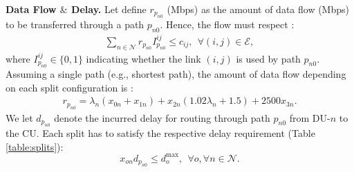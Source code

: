 \textbf{Data Flow $\&$ Delay.}  Let define $r_{p_{n0}}$ (Mbps) as the amount of data flow (Mbps) to be transferred through a path $p_{n0}$. Hence, the flow must respect :
%
\begin{align} \label{eq:route1}
\sum_{n \in \mathcal{N}} r_{p_{n0}} I^{ij}_{p_{n0}} \leq c_{ij}, \ \ \forall (i,j) \in \mathcal{E},
\end{align}
%
where $I^{ij}_{p_{n0}} \in \{ 0,1 \}$ indicating whether the link $(i,j)$ is used by path $p_{n0}$. Assuming a single path (e.g., shortest path), the amount of data flow depending on each split configuration is \cite{fluidran_andres}:
%
\begin{align} \label{eq:route2}
r_{p_{n0}} \!=\! \lambda_{n} (x_{0n} + x_{1n}) + x_{2n} (1.02 \lambda_{n} + 1.5) + 2500 x_{3n}.
\end{align}
%
We let $d_{p_{n0}}$ denote the incurred delay for routing through path $p_{n0}$ from DU-$n$ to the CU. Each split has to satisfy the respective delay requirement (Table \ref{table:splits}):
%
\begin{equation} \label{eq:delay}
x_{on} d_{p_{n0}} \leq d_o^{\text{max}}, \ \ \forall o, \forall n \in \mathcal{N}.
\end{equation}
%
